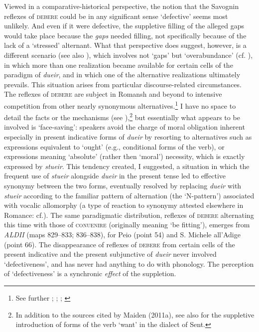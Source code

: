 \documentclass[output=paper,
modfonts
]{LSP/langsci}
\begin{document}
Viewed in a comparative-historical perspective, the notion that the
Savognin reflexes of \textsc{debere} could be in any significant sense
`defective' seems most unlikely. And even if it were defective, the
suppletive filling of the alleged gaps would take place because the
\emph{gaps} needed filling, not specifically because of the lack of a
`stressed' alternant. What that perspective does suggest, however, is a
different scenario (see also \citealt[46--49]{maiden2011a}), which involves not
`gaps' but `overabundance' (cf. \citealt{thornton2011}), in which more than one
realization became available for certain cells of the paradigm of
\emph{dueir}, and in which one of the alternative realizations
ultimately prevails. This situation arises from particular
discourse-related circumstances. The reflexes of \textsc{debere} are
subject in Romansh and beyond to intensive competition from other nearly
synonymous alternatives.\footnote{See further \citet[49]{sturzinger1879};
  \citet[84]{tagliavini1926a}; \citet[64]{kramer1976a}; \citet{maiden2011b}} I have no
space to detail the facts or the mechanisms (see \citealt{maiden2011a}),\footnote{In addition to the sources cited by Maiden (2011a), see
  also \citet[166f.]{pult1879a} for the suppletive introduction of forms of the
  verb `want' in the dialect of Sent.} but essentially what appears to
be involved is `face-saving': speakers avoid the charge of moral
obligation inherent especially in present indicative forms of
\emph{dueir} by resorting to alternatives such as expressions equivalent
to `ought' (e.g., conditional forms of the verb), or expressions meaning
`absolute' (rather then `moral') necessity, which is exactly expressed
by \emph{stueir}. This tendency created, I suggested, a situation in
which the frequent use of \emph{stueir} alongside \emph{dueir} in the
present tense led to effective synonymy between the two forms,
eventually resolved by replacing \emph{dueir} with \emph{stueir}
according to the familiar pattern of alternation (the `N-pattern')
associated with vocalic allomorphy (a type of reaction to synonymy
attested elsewhere in Romance: cf.\citep{maiden2004a, maiden2006a}). The same
paradigmatic distribution, reflexes of \textsc{debere} alternating this
time with those of \textsc{conuenire} (originally meaning `be fitting'),
emerges from \emph{ALDII} (maps 829--833; 836--838), for Peio (point 54)
and S. Michele all'Adige (point 66). The disappearance of reflexes of
\textsc{debere} from certain cells of the present indicative and the
present subjunctive of \emph{dueir} never involved `defectiveness', and
has never had anything to do with phonology. The perception of
`defectiveness' is a synchronic \emph{effect} of the suppletion.
\end{document}
